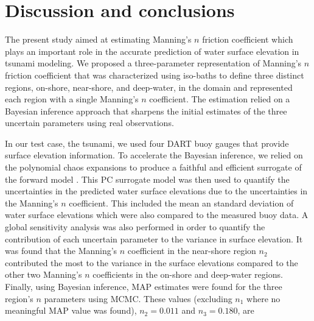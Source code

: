 \section{Discussion and conclusions}
\label{sec:conc}

The present study aimed at estimating Manning's $n$ friction coefficient 
which plays an important role in the accurate prediction of water surface elevation in 
tsunami modeling. We proposed a three-parameter representation
of Manning's $n$ friction coefficient that was characterized using iso-baths 
to define three distinct regions, on-shore, near-shore, and deep-water, in the domain and represented each region with a single Manning's $n$ coefficient.  The estimation relied on a Bayesian inference approach that sharpens the initial estimates of the three uncertain parameters
using real observations. 

In our test case, the \tohoku tsunami, we used four DART buoy gauges that provide 
surface elevation information.  To accelerate the Bayesian inference, we relied on the polynomial 
chaos expansions to produce a faithful and efficient surrogate of the forward model \geoclaw.  This PC surrogate model was then used to quantify the uncertainties in the predicted water surface elevations due to the uncertainties in the Manning's $n$ coefficient.  This included the mean an standard deviation of water surface elevations which were also compared to the measured buoy data.  A global sensitivity analysis was also performed in order to quantify the contribution of each uncertain parameter to the variance in surface elevation.  It was found that the Manning's $n$ coefficient in the near-shore region $n_2$ contributed the most to the variance in the surface elevations compared to the other two Manning's $n$ coefficients in the on-shore and deep-water regions.  Finally, using Bayesian inference, MAP estimates were found for the three region's $n$ parameters using MCMC.  These values (excluding $n_1$ where no meaningful MAP value was found), $n_2=0.011$ and $n_3=0.180$, are 




